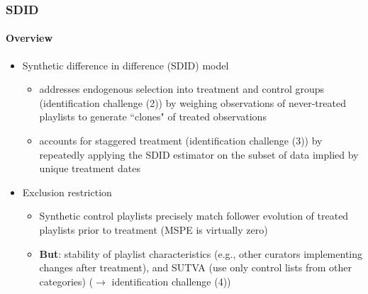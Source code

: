 \documentclass[8pt]{beamer}
\begin{document}

\begin{frame}[label=shortversion]

    \frametitle{SDID}
    \framesubtitle{Overview}
    
    \begin{itemize}

    \item Synthetic difference in difference (SDID) model~\cite{SDiD_AER_Arkhangelsky_21} 
        \begin{itemize}
        \item addresses endogenous selection into treatment and control groups (identification challenge (2)) by weighing observations of never-treated playlists to generate ``clones" of treated observations
        \item accounts for staggered treatment (identification challenge (3)) by repeatedly applying the SDID estimator on the subset of data implied by unique treatment dates
        \end{itemize}
        \vspace{.2cm}
    \item Exclusion restriction
        \begin{itemize}
            \item Synthetic control playlists precisely match follower evolution of treated playlists prior to treatment (MSPE is virtually zero)
            \item \textbf{But}: stability of playlist characteristics (e.g., other curators implementing changes after treatment), and SUTVA (use only control lists from other categories) ($\rightarrow$ identification challenge (4))
        \end{itemize}
    \end{itemize}
    
    
    \end{frame}
    
    
\end{document}
